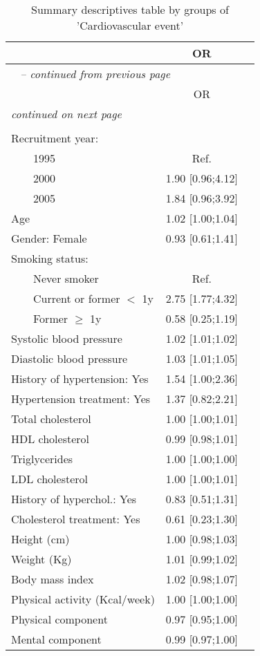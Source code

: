 
    \begin{longtable}{lcc} 
    \caption{Summary descriptives table by groups of 'Cardiovascular event'}\\
    \hline  
     &        OR    \\ 
  
    \hline
    \hline     
    \endfirsthead 
    \multicolumn{3}{l}{\tablename\ \thetable{} \textit{-- continued from previous page}}\\ 
    \hline
     &        OR    \\ 

    \hline
    \hline  
    \endhead   
    \hline
    \multicolumn{2}{l}{\textit{continued on next page}} \\ 
    \endfoot   
    \multicolumn{2}{l}{}  \\ 
    \endlastfoot 
    Recruitment year: &              \\ 
$\qquad$1995 &       Ref.       \\ 
$\qquad$2000 & 1.90 [0.96;4.12]  \\ 
$\qquad$2005 & 1.84 [0.96;3.92] \\ 
Age & 1.02 [1.00;1.04]  \\ 
Gender: Female & 0.93 [0.61;1.41]      \\ 
Smoking status: &                    \\ 
$\qquad$Never smoker &       Ref.            \\ 
$\qquad$Current or former $<$ 1y & 2.75 [1.77;4.32]     \\ 
$\qquad$Former $\geq$ 1y & 0.58 [0.25;1.19]    \\ 
Systolic blood pressure & 1.02 [1.01;1.02]     \\ 
Diastolic blood pressure & 1.03 [1.01;1.05]      \\ 
History of hypertension: Yes & 1.54 [1.00;2.36]      \\ 
Hypertension treatment: Yes & 1.37 [0.82;2.21]      \\ 
Total cholesterol & 1.00 [1.00;1.01]      \\ 
HDL cholesterol & 0.99 [0.98;1.01]     \\ 
Triglycerides & 1.00 [1.00;1.00]      \\ 
LDL cholesterol & 1.00 [1.00;1.01]    \\ 
History of hyperchol.: Yes & 0.83 [0.51;1.31]      \\ 
Cholesterol treatment: Yes & 0.61 [0.23;1.30]      \\ 
Height (cm) & 1.00 [0.98;1.03]      \\ 
Weight (Kg) & 1.01 [0.99;1.02]      \\ 
Body mass index & 1.02 [0.98;1.07]    \\ 
Physical activity (Kcal/week) & 1.00 [1.00;1.00]     \\ 
Physical component & 0.97 [0.95;1.00]     \\ 
Mental component & 0.99 [0.97;1.00]       \\ 
 
    \hline
    
    \end{longtable}
